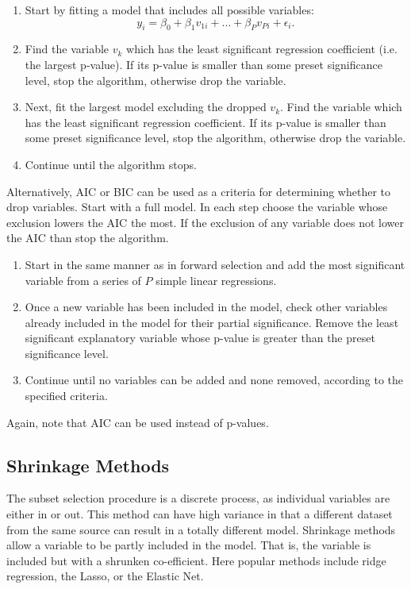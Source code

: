 \begin{enumerate}
\item Start by fitting a model that includes all possible variables:
$$
y_i = \beta_0 +\beta_1 v_{1i} + \dots + \beta_Pv_{Pi} +  \epsilon_i .
$$

\item Find the variable $v_k$ which has the least significant regression coefficient (i.e. the largest p-value).
If its p-value is smaller than some preset significance level, stop the algorithm, otherwise drop the variable. 

\item Next, fit the largest model excluding the dropped $v_k$.
Find the variable which has the least significant regression coefficient.
If its p-value is smaller than some preset significance level, stop the algorithm, otherwise drop the variable. 

\item Continue until the algorithm stops.
\end{enumerate}

Alternatively, AIC or BIC can be used as a criteria for determining whether to drop variables.
Start with a full model. In each step choose the variable whose exclusion lowers the AIC the most. 
If the exclusion of any variable does not lower the AIC than stop the algorithm.

\bigskip
{}

\begin{enumerate}
\item Start in the same manner as in forward selection and add the most significant variable from a series of $P$ simple linear regressions. 

\item Once a new variable has been included in the model, check other variables already included in the model for their partial significance. 
Remove the least significant explanatory variable whose p-value is greater than the preset significance level. 

\item Continue until no variables can be added and none removed, according to the specified criteria.
\end{enumerate}

Again, note that AIC can be used instead of p-values.


\subsection{Shrinkage Methods}

The subset selection procedure is a discrete process, as individual variables are either in or out.
This method can have high variance in that a different dataset from the same source can result in a totally different model. Shrinkage methods allow a variable to be partly included in the model. That is, the variable is included but with a shrunken co-efficient. Here popular methods include ridge regression, the Lasso, or the Elastic Net.

